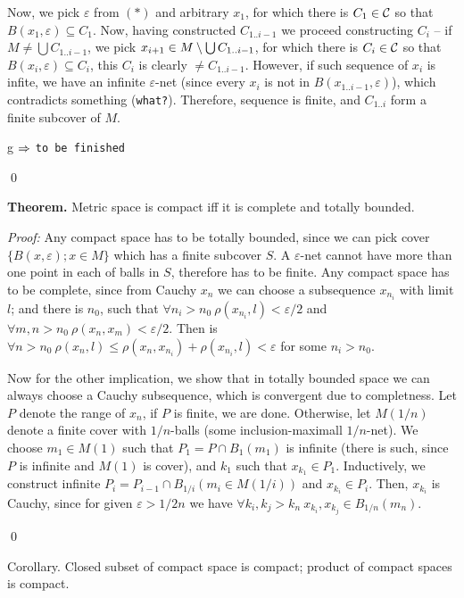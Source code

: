 Now, we pick $\varepsilon$ from $(*)$ and arbitrary $x_1$, for which there
is $C_1 \in \cal C$ so that $B(x_1,\varepsilon)\subseteq C_1$. Now, having 
constructed $C_{1..i-1}$ we proceed constructing $C_i$ -- if $M\neq \bigcup
C_{1..i-1}$, we pick $x_{i+1} \in M\setminus \bigcup C_{1..i-1}$, for which there 
is $C_i \in \cal C$ so that $B(x_i,\varepsilon)\subseteq C_i$, this $C_i$ 
is clearly $\neq C_{1..i-1}$. However, if such sequence of $x_i$ is infite, 
we have an infinite $\varepsilon$-net (since every $x_i$ is not in 
$B(x_{1..i-1},\varepsilon)$), which contradicts something ({\tt what?}). 
Therefore, sequence is finite, and $C_{1..i}$ form a finite subcover of $M$.

\smallskip

g $\Rightarrow$ {\tt to be finished}

\qed
\medskip

{\bf Theorem.} Metric space is compact iff it is complete and totally bounded.

{\it Proof:} Any compact space has to be totally bounded, since we can pick
cover $\{B(x,\varepsilon);x\in M\}$ which has a finite subcover $S$. A
$\varepsilon$-net cannot have more than one point in each of balls in $S$,
therefore has to be finite. Any compact space has to be complete, since from
Cauchy $x_n$ we can choose a subsequence $x_{n_i}$ with limit $l$; and there is
$n_0$, such that $\forall n_i > n_0\ \rho(x_{n_i},l) < \varepsilon/2$ and
$\forall m,n > n_0\ \rho(x_n,x_m) < \varepsilon/2$. Then is $\forall n>n_0 \
\rho(x_n,l) \leq \rho(x_n,x_{n_i}) + \rho(x_{n_i},l) < \varepsilon$ for some
$n_i > n_0$.

Now for the other implication, we show that in totally bounded space we can
always choose a Cauchy subsequence, which is convergent due to completness. Let
$P$ denote the range of $x_n$, if $P$ is finite, we are done. Otherwise, let 
$M(1/n)$ denote a finite cover with $1/n$-balls (some inclusion-maximall
$1/n$-net). We choose $m_1\in M(1)$ such that $P_1 = P\cap B_1(m_1)$ is infinite
(there is such, since $P$ is infinite and $M(1)$ is cover), and $k_1$ such that
$x_{k_1} \in P_1$. Inductively, we construct infinite $P_i = P_{i-1} \cap
B_{1/i}(m_i \in M(1/i))$ and $x_{k_i} \in P_i$. Then, $x_{k_i}$ is Cauchy, since
for given $\varepsilon > 1/2n$ we have $\forall k_i, k_j > k_n\ x_{k_i},x_{k_j}
\in B_{1/n}(m_n)$.

\qed

\proclaim Corollary. Closed subset of compact space is compact; product of
compact spaces is compact.

